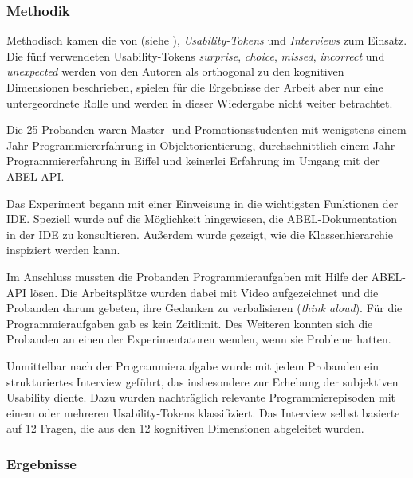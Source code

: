 \subsubsection{Methodik}

Methodisch kamen die  von \cite{Anonymous:9HSMlhmF} (siehe ), \textit{Usability-Tokens} und \textit{Interviews} zum Einsatz. Die fünf verwendeten Usability-Tokens \textit{surprise}, \textit{choice}, \textit{missed}, \textit{incorrect} und \textit{unexpected} werden von den Autoren als orthogonal zu den kognitiven Dimensionen beschrieben, spielen für die Ergebnisse der Arbeit aber nur eine untergeordnete Rolle und werden in dieser Wiedergabe nicht weiter betrachtet.

Die 25 Probanden waren Master- und Promotionsstudenten mit wenigstens einem Jahr Programmiererfahrung in Objektorientierung, durchschnittlich einem Jahr Programmiererfahrung in Eiffel und keinerlei Erfahrung im Umgang mit der ABEL-API.

Das Experiment begann mit einer Einweisung in die wichtigsten Funktionen der IDE. Speziell wurde auf die Möglichkeit hingewiesen, die ABEL-Dokumentation in der IDE zu konsultieren. Außerdem wurde gezeigt, wie die Klassenhierarchie inspiziert werden kann.

Im Anschluss mussten die Probanden Programmieraufgaben mit Hilfe der ABEL-API lösen. Die Arbeitsplätze wurden dabei mit Video aufgezeichnet und die Probanden darum gebeten, ihre Gedanken zu verbalisieren (\textit{think aloud}). Für die Programmieraufgaben gab es kein Zeitlimit. Des Weiteren konnten sich die Probanden an einen der Experimentatoren wenden, wenn sie Probleme hatten.

Unmittelbar nach der Programmieraufgabe wurde mit jedem Probanden ein strukturiertes Interview geführt, das insbesondere zur Erhebung der subjektiven Usability diente. Dazu wurden nachträglich relevante Programmierepisoden mit einem oder mehreren Usability-Tokens klassifiziert. Das Interview selbst basierte auf 12 Fragen, die aus den 12 kognitiven Dimensionen abgeleitet wurden.

\subsubsection{Ergebnisse}


